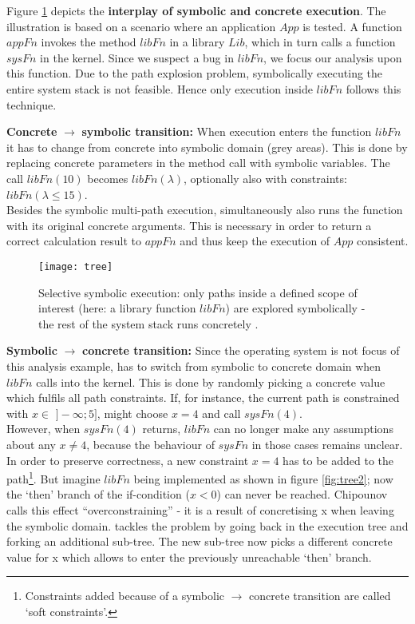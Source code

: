 
Figure \ref{fig:tree} depicts the \textbf{interplay of symbolic and concrete execution}.
The illustration is based on a scenario where an application $App$ is tested.
A function $appFn$ invokes the method $libFn$ in a library $Lib$, which in turn calls a function $sysFn$ in the kernel.
Since we suspect a bug in $libFn$, we focus our analysis upon this function.
Due to the path explosion problem, symbolically executing the entire system stack is not feasible.
Hence only execution inside $libFn$ follows this technique.

\textbf{Concrete} $\rightarrow$ \textbf{symbolic transition:}
When execution enters the function $libFn$ it has to change from concrete into symbolic domain (grey areas).
This is done by replacing concrete parameters in the method call with symbolic variables.
The call $libFn(10)$ becomes $libFn(\lambda)$, optionally also with constraints: $libFn(\lambda \le 15)$.\\
Besides the symbolic multi-path execution, \sse simultaneously also runs the function with its original concrete arguments.
This is necessary in order to return a correct calculation result to $appFn$ and thus keep the execution of $App$ consistent.


\begin{figure}
\texttt{[image: tree]}
\caption{Selective symbolic execution: only paths inside a defined scope of interest (here: a library function $libFn$) are explored symbolically - the rest of the system stack runs concretely \cite{chip14s2e}.}
\label{fig:tree}
\end{figure}

\textbf{Symbolic} $\rightarrow$ \textbf{concrete transition:}
Since the operating system is not focus of this analysis example, \sse has to switch from symbolic to concrete domain when $libFn$ calls into the kernel.
This is done by randomly picking a concrete value which fulfils all path constraints.
If, for instance, the current path is constrained with $x \in$ $]-\infty;5]$, \sse might choose $x=4$ and call $sysFn(4)$.\\
However, when $sysFn(4)$ returns, $libFn$ can no longer make any assumptions about any $x \neq 4$, because the behaviour of $sysFn$ in those cases remains unclear.
In order to preserve correctness, a new constraint $x = 4$ has to be added to the path\footnote{Constraints added because of a symbolic $\rightarrow$ concrete transition are called `soft constraints'.}.
But imagine $libFn$ being implemented as shown in figure \ref{fig:tree2}; now the `then' branch of the if-condition ($x < 0$) can never be reached.
Chipounov calls this effect ``overconstraining'' \cite{chip14s2e} - it is a result of concretising x when leaving the symbolic domain.
\sse tackles the problem by going back in the execution tree and forking an additional sub-tree.
The new sub-tree now picks a different concrete value for x which allows to enter the previously unreachable `then' branch.

